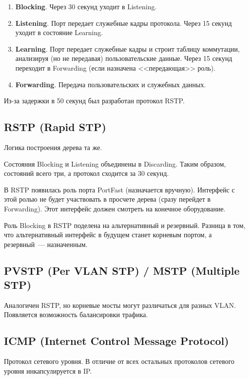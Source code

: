 \begin{enumerate}
    \item \textbf{Blocking}. Через 30 секунд уходит в Listening.
    \item \textbf{Listening}. Порт передает служебные кадры протокола. Через 15 секунд уходит в состояние Learning.
    \item \textbf{Learning}. Порт передает служебные кадры и строит таблицу коммутации, анализируя (но не передавая) пользовательские данные. Через 15 секунд переходит в Forwarding (если назначена <<передающая>> роль).
    \item \textbf{Forwarding}. Передача пользовательских и служебных данных.
\end{enumerate}

Из-за задержки в 50 секунд был разработан протокол RSTP.

\subsection{RSTP (Rapid STP)}

Логика построения дерева та же.

Состояния Blocking и Listening объединены в Discarding. Таким образом, состояний всего три, а протокол сходится за 30 секунд.

В RSTP появилась роль порта PortFast (назначается вручную). Интерфейс с этой ролью не будет участвовать в просчете дерева (сразу перейдет в Forwarding). Этот интерфейс должен смотреть на конечное оборудование.

Роль Blocking в RSTP поделена на альтернативный и резервный. Разница в том, что альтернативный интерфейс в будущем станет корневым портом, а резервный~--- назначенным.

\subsection{PVSTP (Per VLAN STP) / MSTP (Multiple STP)}

Аналогичен RSTP, но корневые мосты могут различаться для разных VLAN. Появляется возможность балансировки трафика.

\subsection{ICMP (Internet Control Message Protocol)}

Протокол сетевого уровня. В отличие от всех остальных протоколов сетевого уровня инкапсулируется в IP.

